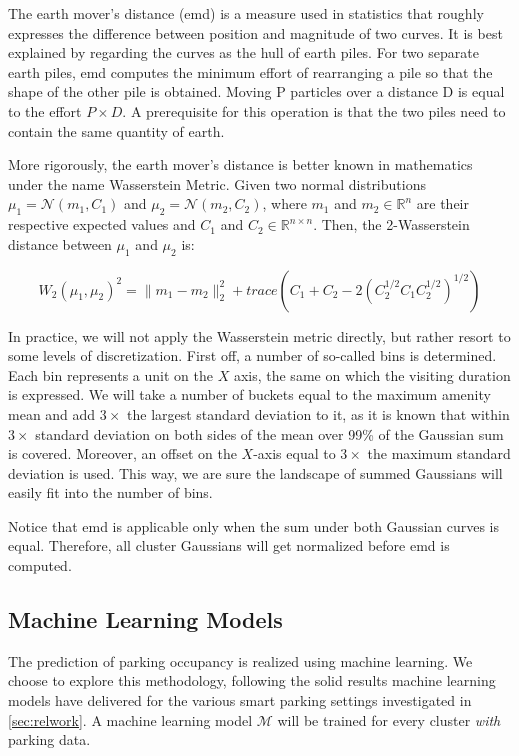 The earth mover's distance (emd) is a measure used in statistics that roughly expresses the difference between position and magnitude of two curves.
It is best explained by regarding the curves as the hull of earth piles.
For two separate earth piles, emd computes the minimum effort of rearranging a pile so that the shape of the other pile is obtained.
Moving P particles over a distance D is equal to the effort $P \times D$.
A prerequisite for this operation is that the two piles need to contain the same quantity of earth.

More rigorously, the earth mover's distance is better known in mathematics under the name Wasserstein Metric.
Given two normal distributions $\mu_1=\mathcal{N}(m_1,C_1)$ and $\mu_2=\mathcal{N}(m_2,C_2)$, where $m_1$ and $m_2 \in \mathbb{R}^{n}$ are their respective expected values and $C_1$ and $C_2 \in \mathbb{R}^{n\times n}$.
Then, the 2-Wasserstein distance between $\mu_1$ and $\mu_2$ is:

\begin{equation}
W_2(\mu_1,\mu_2)^2={\lVert}m_1-m_2{\rVert}^2_2+trace(C_1+C_2-2(C_2^{1/2}C_1C_2^{1/2})^{1/2})
\end{equation}

In practice, we will not apply the Wasserstein metric directly, but rather resort to some levels of discretization.
First off, a number of so-called bins is determined.
Each bin represents a unit on the $X$ axis, the same on which the visiting duration is expressed.
We will take a number of buckets equal to the maximum amenity mean and add $3\times$ the largest standard deviation to it, as it is known that within $3\times$ standard deviation on both sides of the mean over 99\% of the Gaussian sum is covered.
Moreover, an offset on the $X$-axis equal to $3\times$ the maximum standard deviation is used.
This way, we are sure the landscape of summed Gaussians will easily fit into the number of bins.

Notice that emd is applicable only when the sum under both Gaussian curves is equal.
Therefore, all cluster Gaussians will get normalized before emd is computed.

\subsection{Machine Learning Models}
\label{realization:machine_learning_models}
The prediction of parking occupancy is realized using machine learning.
We choose to explore this methodology, following the solid results machine learning models have delivered for the various smart parking settings investigated in \cref{sec:relwork}. A machine learning model $\mathcal{M}$ will be trained for every cluster \textit{with} parking data.

